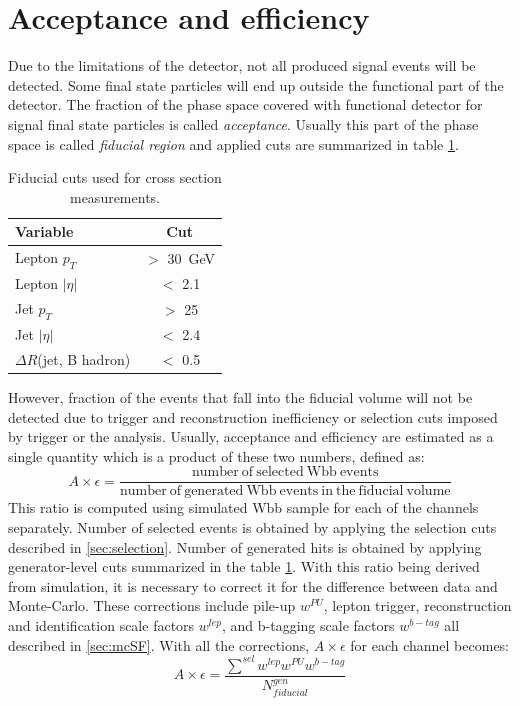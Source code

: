 \section{Acceptance and efficiency}
\label{sec:AE}
    
Due to the limitations of the detector, not all produced signal events will be detected. Some final state particles will end up outside the functional part of the detector. The fraction of the phase space covered with functional detector for signal final state particles is called \textit{acceptance}. Usually this part of the phase space is called \textit{fiducial region} and applied cuts are summarized in table \ref{tab:fiducial}.             
\begin{table}[!htb]
\begin{center}
   \begin{tabular} {l c} \hline \hline
        Variable         & Cut \\
        \hline
        Lepton $p_T$    & $>$ 30\ GeV \\
        Lepton $|\eta|$   & $<$ 2.1 \\
        Jet $p_T$       & $>$ 25  \\
        Jet $|\eta|$      & $<$ 2.4 \\
        $\Delta R$(jet, B hadron) & $<$ 0.5} \\
        \hline\hline
   \end{tabular}
\caption{Fiducial cuts used for cross section measurements.}
\label{tab:fiducial}
\end{center}
\end{table}
However, fraction of the events that fall into the fiducial volume will not be detected due to trigger and reconstruction inefficiency or selection cuts imposed by trigger or the analysis. Usually, acceptance and efficiency are estimated as a single quantity which is a product of these two numbers, defined as:
\begin{equation}
A\times \epsilon=\frac{\mathrm{number\ of\ selected\ Wbb\ events}}{\mathrm{number\ of\ generated\ Wbb\ events\ in\ the\ fiducial\ volume}}
\end{equation}
This ratio is computed using simulated Wbb sample for each of the channels separately. Number of selected events is obtained by applying the selection cuts described in \ref{sec:selection}. Number of generated hits is obtained by applying generator-level cuts summarized in the table \ref{tab:fiducial}. With this ratio being derived from simulation, it is necessary to correct it for the difference between data and Monte-Carlo. These corrections include pile-up  $w^{PU}$, lepton trigger, reconstruction and identification scale factors $w^{lep}$, and b-tagging scale factors $w^{b-tag}$ all described in \ref{sec:mcSF}. With all the corrections, $A\times \epsilon$ for each channel becomes:
\begin{equation}
A\times \epsilon = \frac{\sum^{sel} w^{lep} w^{PU} w^{b-tag}}{N_{fiducial}^{gen}}
\end{equation}

